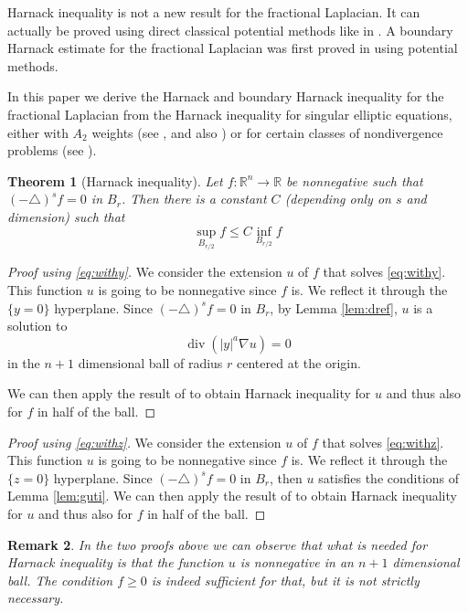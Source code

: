 \documentclass[letterpaper]{article}
\newtheorem{thm}{Theorem}[section]
\newtheorem{preremark}[thm]{Remark}
\newenvironment{remark}{\begin{preremark}\rm}{\medskip \end{preremark}}
\numberwithin{equation}{section}
\newcommand{\R}{\mathbb R}
\newcommand{\grad} {\nabla}
\newcommand{\lap} {\triangle}
\DeclareMathOperator{\dv}{div}
\begin{document}
Harnack inequality is not a new result for the fractional Laplacian. It can actually be proved using direct classical potential methods like in \cite{L}. A boundary Harnack estimate for the fractional Laplacian was first proved in \cite{B} using potential methods.

In this paper we derive the Harnack and boundary Harnack inequality for the fractional Laplacian from the Harnack inequality for singular elliptic equations, either with $A_2$ weights (see \cite{FKS}, \cite{FKJ} and also \cite{Penny}) or for certain classes of nondivergence problems (see \cite{CG}).

\begin{thm} [Harnack inequality] \label{thm:harnack}
Let $f :\R^n \to \R$ be nonnegative such that $(-\lap)^s f = 0$ in $B_r$. Then there is a constant $C$ (depending only on $s$ and dimension) such that
\[ \sup_{B_{r/2}} f \leq C \inf_{B_{r/2}} f \]
\end{thm}

\begin{proof}[Proof using \eqref{eq:withy}]
We consider the extension $u$ of $f$ that solves \eqref{eq:withy}. This function $u$ is going to be nonnegative since $f$ is. We reflect it through the $\{y=0\}$ hyperplane. Since $(-\lap)^s f = 0$ in $B_r$, by Lemma \ref{lem:dref}, $u$ is a solution to
\[ \dv \left( |y|^a \grad u \right) = 0 \]
in the $n+1$ dimensional ball of radius $r$ centered at the origin.

We can then apply the result of \cite{FKS} to obtain Harnack inequality for $u$ and thus also for $f$ in half of the ball.
\end{proof}

\begin{proof}[Proof using \eqref{eq:withz}]
We consider the extension $u$ of $f$ that solves \eqref{eq:withz}. This function $u$ is going to be nonnegative since $f$ is. We reflect it through the $\{z=0\}$ hyperplane. Since $(-\lap)^s f = 0$ in $B_r$, then $u$ satisfies the conditions of Lemma \ref{lem:guti}. We can then apply the result of \cite{CG} to obtain Harnack inequality for $u$ and thus also for $f$ in half of the ball.
\end{proof}

\begin{remark}
In the two proofs above we can observe that what is needed for Harnack inequality is that the function $u$ is nonnegative in an $n+1$ dimensional ball. The condition $f \geq 0$ is indeed sufficient for that, but it is not strictly necessary.
\end{remark}
\end{document}
